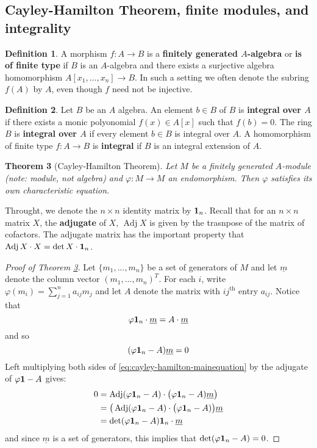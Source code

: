 \documentclass[12pt]{article}
\theoremstyle{plain}
\newtheorem{thm}{Theorem}[subsection] %
\theoremstyle{definition}
\newtheorem{defn}[thm]{Definition} %
\begin{document}
	\subsection{Cayley-Hamilton Theorem, finite modules, and integrality}
	\begin{defn}
		A morphism $f:A \to B$ is a \textbf{finitely generated $A$-algebra} or \textbf{is of finite type} if $B$ is an $A$-algebra and there exists a surjective algebra homomorphism $A[x_1,...,x_n] \to B$. In such a setting we often denote the subring $f(A)$ by $A$, even though $f$ need not be injective.
	\end{defn}
	\begin{defn}
		Let $B$ be an $A$ algebra. An element $b\in B$ of $B$ is \textbf{integral over $A$} if there exists a monic polyonomial $f(x) \in A[x]$ such that $f(b) = 0$. The ring $B$ is \textbf{integral over $A$} if every element $b \in B$ is integral over $A$. A homomorphism of finite type $f: A \to B$ is \textbf{integral} if $B$ is an integral extension of $A$.
	\end{defn}
	\begin{thm}[Cayley-Hamilton Theorem]\label{thm:cayley_hamilton}
		Let $M$ be a finitely generated $A$-module (note: module, not algebra) and $\varphi: M \to M$ an endomorphism. Then $\varphi$ satisfies its own characteristic equation.
	\end{thm}
	Throught, we denote the $n\times n$ identity matrix by $\bold{1}_n$. Recall that for an $n \times n$ matrix $X$, the \textbf{adjugate} of $X$, $\operatorname{Adj}X$ is given by the trasnpose of the matrix of cofactors. The adjugate matrix has the important property that $\operatorname{Adj}X\cdot X = \operatorname{det}X\cdot \bold{1}_n$.
	\begin{proof}[Proof of Theorem \ref{thm:cayley_hamilton}]
		Let $\lbrace m_1,...,m_n\rbrace$ be a set of generators of $M$ and let $\underline{m}$ denote the column vector $(m_1,...,m_n)^T$. For each $i$, write $\varphi(m_i) = \sum_{j = 1}^n a_{ij}m_j$ and let $A$ denote the matrix with $ij^\text{th}$ entry $a_{ij}$. Notice that
		\begin{equation}
			\varphi \bold{1}_n\cdot \underline{m} = A\cdot \underline{m}
		\end{equation}
		and so
		\begin{equation}\label{eq:cayley-hamilton-mainequation}
			(\varphi \bold{1}_n - A) \underline{m} = 0
		\end{equation}
		Left multiplying both sides of \eqref{eq:cayley-hamilton-mainequation} by the adjugate of $\varphi\bold{1} - A$ gives:
		\begin{align*}
			0 &= \operatorname{Adj}(\varphi \bold{1}_n - A)\cdot \big(\varphi \bold{1}_n - A)\underline{m}\big)\\
			&= \big(\operatorname{Adj}(\varphi \bold{1}_n - A)\cdot \big(\varphi \bold{1}_n - A)\big)\underline{m}\\
			&= \operatorname{det}(\varphi \bold{1}_n - A)\bold{1}_n \cdot \underline{m}
		\end{align*}
		and since $\underline{m}$ is a set of generators, this implies that $\operatorname{det}(\varphi \bold{1}_n - A) = 0$.
	\end{proof}
\end{document}
